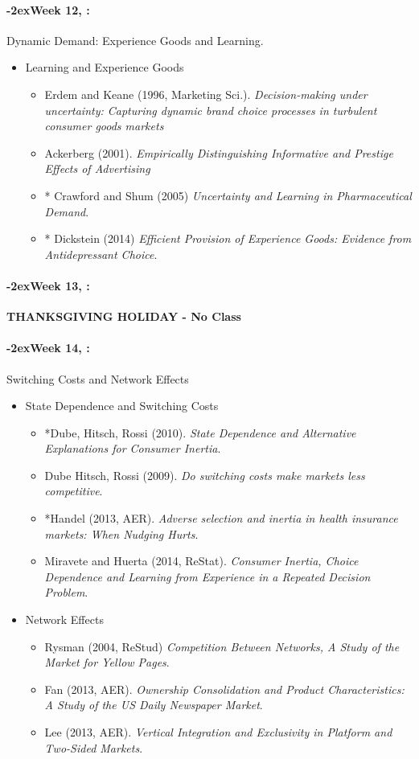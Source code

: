 \documentclass[11pt]{article}
\newcommand{\week}[1]{%
  \paragraph*{\kern-2ex\quad #1, \syldate{\today}:}%
  \AdvanceDate[7]%
}
\begin{document}
\week{Week 12} Dynamic Demand: Experience Goods and Learning.
\begin{itemize}
\item Learning and Experience Goods
\begin{itemize}
\item Erdem and Keane (1996, Marketing Sci.). \textit{Decision-making under uncertainty: Capturing dynamic brand choice processes in turbulent consumer goods markets}
\item Ackerberg (2001). \textit{Empirically Distinguishing Informative and Prestige Effects of Advertising}
\item * Crawford and Shum (2005) \textit{Uncertainty and Learning in Pharmaceutical Demand}.
\item * Dickstein (2014) \textit{Efficient Provision of Experience Goods: Evidence from Antidepressant Choice}.
\end{itemize}
\end{itemize}

\week{Week 13} \textbf{THANKSGIVING HOLIDAY - No Class}


\week{Week 14} Switching Costs and Network Effects
\begin{itemize}
\item State Dependence and Switching Costs
\begin{itemize}
\item *Dube, Hitsch, Rossi (2010). \textit{State Dependence and Alternative Explanations for Consumer Inertia}.
\item Dube Hitsch, Rossi (2009). \textit{Do switching costs make markets less competitive}.
\item *Handel (2013, AER). \textit{Adverse selection and inertia in health insurance markets: When Nudging Hurts}.
\item Miravete and Huerta (2014, ReStat). \textit{Consumer Inertia, Choice Dependence and Learning from Experience in a Repeated Decision Problem}.
\end{itemize}
\item Network Effects
\begin{itemize}
\item Rysman (2004, ReStud) \textit{Competition Between Networks, A Study of the Market for Yellow Pages}.
\item Fan (2013, AER). \textit{Ownership Consolidation and Product Characteristics: A Study of the US Daily Newspaper Market}.
\item Lee (2013, AER). \textit{Vertical Integration and Exclusivity in Platform and Two-Sided Markets}.
\end{itemize}
\end{itemize}
\end{document}
